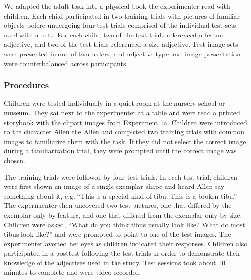 \documentclass[10pt,letterpaper]{article}
\begin{document}
We adapted the adult task into a physical book the experimenter read with children.  Each child participated in two training trials with pictures of familiar objects before undergoing four test trials comprised of the individual test sets used with adults.  For each child, two of the test trials referenced a feature adjective, and two of the test trials referenced a size adjective.  Test image sets were presented in one of two orders, and adjective type and image presentation were counterbalanced across participants. 


\subsubsection{Procedures}

Children were tested individually in a quiet room at the nursery school or museum.  They sat next to the experimenter at a table and were read a printed storybook with the clipart images from Experiment 1a.  Children were introduced to the character Allen the Alien and completed two training trials with common images to familiarize them with the task. %
If they did not select the correct image during a familiarization trial, they were prompted until the correct image was chosen.

The training trials were followed by four test trials.  In each test trial, children were first shown an image of a single exemplar shape and heard Allen say something about it, e.g. ``This is a special kind of tibu. This is a broken tibu.''  The experimenter then uncovered two test pictures, one that differed by the exemplar only by feature, and one that differed from the exemplar only by size.  Children were asked, ``What do you think tibus usually look like? What do most tibus look like?'' and were prompted to point to one of the test images.  The experimenter averted her eyes as children indicated their responses. 
Children also participated in a posttest following the test trials in order to demonstrate their knowledge of the adjectives used in the study.  Test sessions took about 10 minutes to complete and were video-recorded.  
\end{document}
